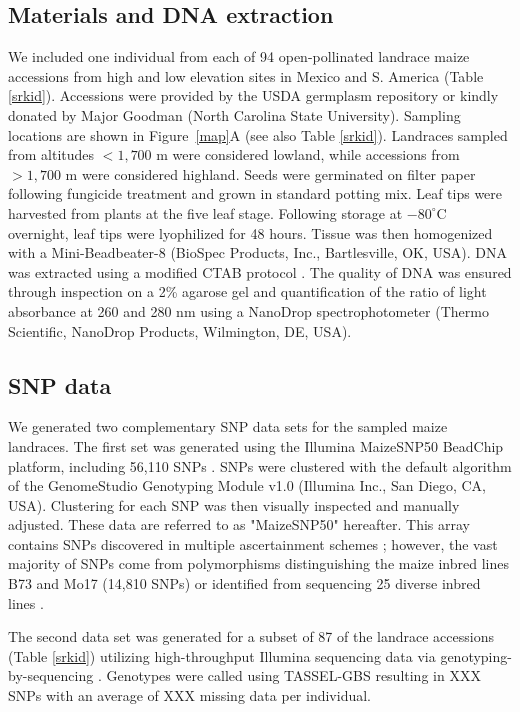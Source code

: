 \subsection*{Materials and DNA extraction}
We included one individual from each of 94 open-pollinated landrace maize accessions from high and low elevation sites in Mexico and S. America (Table \ref{srkid}).   
Accessions were provided by the USDA germplasm repository or kindly donated by Major Goodman (North Carolina State University).  
Sampling locations are shown in Figure~\ref{map}A (see also Table \ref{srkid}).  
Landraces sampled from altitudes $<1,700$ m were considered lowland, while accessions from $>1,700$ m were considered highland.  
Seeds were germinated on filter paper following fungicide treatment and grown in standard potting mix.  
Leaf tips were harvested from plants at the five leaf stage.  
Following storage at $-80^{\circ}$C overnight, leaf tips were lyophilized for 48 hours.  
Tissue was then homogenized with a Mini-Beadbeater-8 (BioSpec Products, Inc., Bartlesville, OK, USA).  
DNA was extracted using a modified CTAB protocol \cite[]{CTAB}.  
The quality of DNA was ensured through inspection on a 2\% agarose gel and quantification of the ratio of light absorbance at 260 and 280 nm using a NanoDrop spectrophotometer (Thermo Scientific, NanoDrop Products, Wilmington, DE, USA).

\subsection*{SNP data}
We generated two complementary SNP data sets for the sampled maize landraces. 
The first set was generated using the Illumina MaizeSNP50 BeadChip platform, including 56,110 SNPs \cite[]{Ganal_2011_22174790}.  
SNPs were clustered with the default algorithm of the GenomeStudio Genotyping Module v1.0 (Illumina Inc., San Diego, CA, USA).   
Clustering for each SNP was then visually inspected and manually adjusted.  
These data are referred to as "MaizeSNP50" hereafter.  
This array contains SNPs discovered in multiple ascertainment schemes \cite[]{Ganal_2011_22174790}; however, the vast majority of SNPs come from polymorphisms distinguishing the maize inbred lines B73 and Mo17 (14,810 SNPs) or identified from sequencing 25 diverse inbred lines \cite[40,594 SNPs;][]{Gore20112009}.  

The second data set was generated for a subset of 87 of the landrace accessions (Table \ref{srkid}) utilizing high-throughput Illumina sequencing data via genotyping-by-sequencing \cite[GBS;][]{Elshire2011}.
Genotypes were called using TASSEL-GBS \cite[]{Glaubitz_GBS} resulting in {\color{red} XXX} SNPs with an average of  {\color{red} XXX}  missing data per individual.

